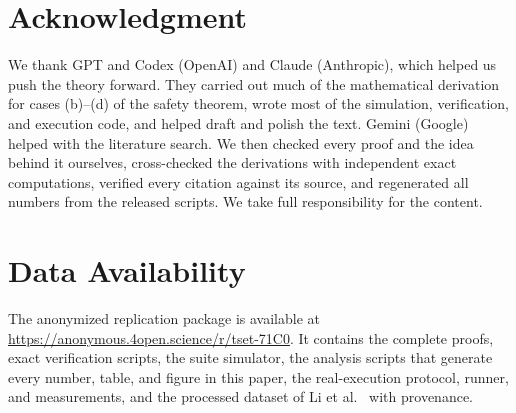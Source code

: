 \documentclass[conference,letterpaper]{IEEEtran}
\theoremstyle{definition}
\begin{document}
\section*{Acknowledgment}
We thank GPT and Codex (OpenAI) and Claude (Anthropic), which helped us push the theory forward. They carried out much of the mathematical derivation for cases (b)--(d) of the safety theorem, wrote most of the simulation, verification, and execution code, and helped draft and polish the text. Gemini (Google) helped with the literature search. We then checked every proof and the idea behind it ourselves, cross-checked the derivations with independent exact computations, verified every citation against its source, and regenerated all numbers from the released scripts. We take full responsibility for the content.

\section*{Data Availability}\label{sec:data}
The anonymized replication package is available at \url{https://anonymous.4open.science/r/tset-71C0}. It contains the complete proofs, exact verification scripts, the suite simulator, the analysis scripts that generate every number, table, and figure in this paper, the real-execution protocol, runner, and measurements, and the processed dataset of Li et al.~\cite{li2023issta} with provenance.



\end{document}
